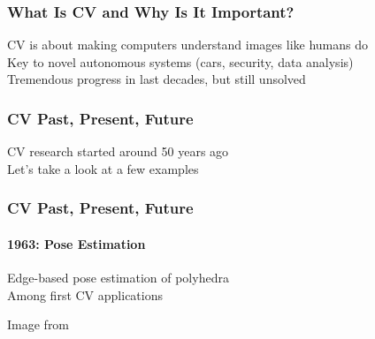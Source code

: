 \documentclass[xetex,professionalfont]{beamer}
\begin{document}

\begin{frame}
\frametitle{What Is CV and Why Is It Important?}

CV is about making computers understand images like humans do\\\medskip
Key to novel autonomous systems (cars, security, data analysis)\\\medskip
Tremendous progress in last decades, but still unsolved

\end{frame}


\begin{frame}
\frametitle{CV Past, Present, Future}

CV research started around 50 years ago\\\medskip
Let's take a look at a few examples

\end{frame}


\begin{frame}
\frametitle{CV Past, Present, Future}
\framesubtitle{1963: Pose Estimation}

Edge-based pose estimation of polyhedra \\\medskip %
Among first CV applications %

\bigskip
\begin{center}
    {\centering Image from \cite{roberts1963}}
\end{center}

\end{frame}

\end{document}
